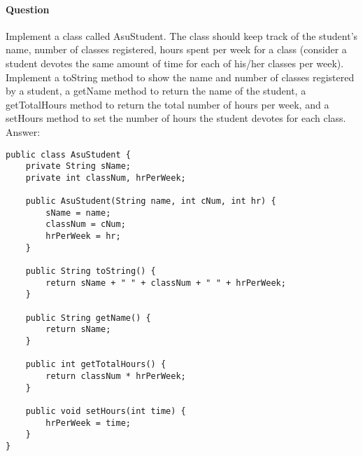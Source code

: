 \documentclass{article}
\begin{document}
\addtocounter{question_num}{1}
\paragraph{Question }
Implement a class called AsuStudent. The class should keep track of the student's name, number of classes registered, hours spent per week for a class (consider a student devotes the same amount of time for each of his/her classes per week). Implement a toString method to show the name and number of classes registered by a student, a getName method to return the name of the student, a getTotalHours method to return the total number of hours per week, and a setHours method to set the number of hours the student devotes for each class.
 {\color{red} \newline Answer:}
\begin{lstlisting}
public class AsuStudent {
	private String sName;
	private int classNum, hrPerWeek;
	
	public AsuStudent(String name, int cNum, int hr) {
		sName = name;
		classNum = cNum;
		hrPerWeek = hr;
	}

	public String toString() {
		return sName + " " + classNum + " " + hrPerWeek;
	}

	public String getName() {
		return sName;
	}

	public int getTotalHours() {
		return classNum * hrPerWeek;
	}

	public void setHours(int time) {
		hrPerWeek = time;
	}
}
\end{lstlisting}
\end{document}
